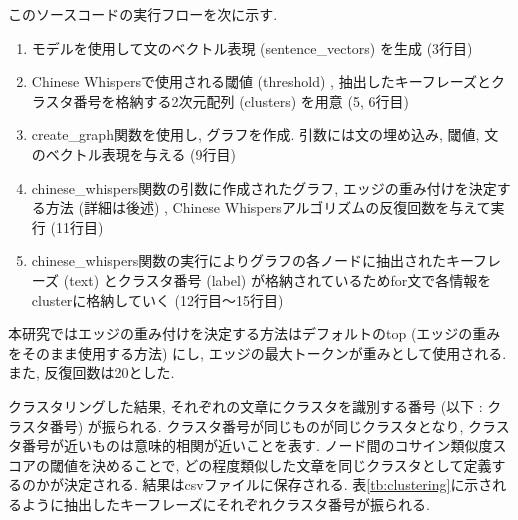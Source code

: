 このソースコードの実行フローを次に示す. 

\begin{enumerate}
  \item モデルを使用して文のベクトル表現 (sentence\_vectors) を生成 (3行目) 
  \item Chinese Whispersで使用される閾値 (threshold) , 抽出したキーフレーズとクラスタ番号を格納する2次元配列 (clusters) を用意 (5, 6行目)
  \item create\_graph関数を使用し, グラフを作成. 引数には文の埋め込み, 閾値, 文のベクトル表現を与える (9行目)
  \item chinese\_whispers関数の引数に作成されたグラフ, エッジの重み付けを決定する方法 (詳細は後述) , Chinese Whispersアルゴリズムの反復回数を与えて実行 (11行目)
  \item chinese\_whispers関数の実行によりグラフの各ノードに抽出されたキーフレーズ (text) とクラスタ番号 (label) が格納されているためfor文で各情報をclusterに格納していく (12行目〜15行目)
\end{enumerate}

本研究ではエッジの重み付けを決定する方法はデフォルトのtop (エッジの重みをそのまま使用する方法) にし, エッジの最大トークンが重みとして使用される. また, 反復回数は20とした. 

クラスタリングした結果, それぞれの文章にクラスタを識別する番号 (以下 : クラスタ番号) が振られる. クラスタ番号が同じものが同じクラスタとなり, クラスタ番号が近いものは意味的相関が近いことを表す. ノード間のコサイン類似度スコアの閾値を決めることで, どの程度類似した文章を同じクラスタとして定義するのかが決定される. 
結果はcsvファイルに保存される. 表\ref{tb:clustering}に示されるように抽出したキーフレーズにそれぞれクラスタ番号が振られる. 

